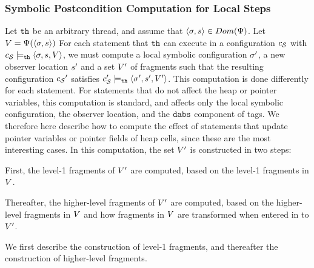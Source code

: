 \subsubsection{Symbolic Postcondition Computation for Local Steps}
Let ${\tt th}$ be an arbitrary thread, and assume
that $\left\langle\sigma,s\right\rangle \in Dom(\Psi)$.
Let $V = \Psi(\left\langle\sigma,s\right\rangle)$
For each statement that ${\tt th}$ can execute in a configuration $c_{\mathcal S}$
with $c_{\mathcal S} \models_{{\tt th}} \left\langle\sigma,s,V\right\rangle$,
we must compute a local symbolic configuration $\sigma'$, a new
observer location $s'$ and a set  $V'$ of fragments
such that the resulting configuration ${c_{\mathcal S}}'$ satisfies
$c_{\mathcal S}' \models_{{\tt th}} \left\langle\sigma',s',V'\right\rangle$.
This computation is done differently for
each statement. For statements that do not affect the heap or pointer variables,
this computation is standard, and affects only the local symbolic
configuration, the observer location, and the $\mathtt{dabs}$ component of
tags.
We therefore here describe how to compute the effect of statements that update
pointer variables or pointer fields of heap cells,
since these are the most interesting cases.
In this computation, the set $V'$ is constructed in two steps:
\begin{inparaenum}[(1)]
\item First, the level-1 fragments of $V'$ are computed, based on
  the level-1 fragments in $V$.
\item
  Thereafter, the higher-level fragments of $V'$ are computed, based
  on the higher-level fragments in $V$ and
  how fragments in $V$ are transformed
  when entered in to $V'$.
\end{inparaenum}
We first describe the construction of level-1 fragments, and thereafter the
construction of higher-level fragments.

